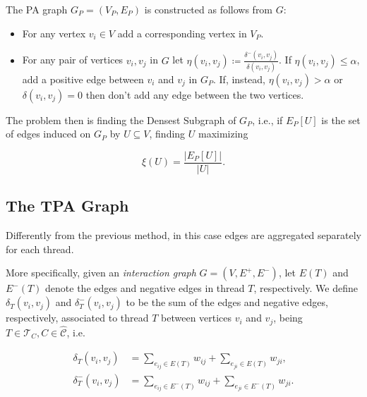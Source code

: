 \bigskip

The \acrfull{PA} graph $G_P = (V_{P}, E_{P}) $ is constructed as follows from
$G$:

\begin{itemize}
	\item For any vertex $v_{i} \in V$ add a corresponding vertex in $V_{P} $.
	\item For any pair of vertices $v_i, v_j$ in $G$ let $\eta(v_i,v_j)
		      \coloneqq \frac{\delta^{-} (v_i,v_j)}{\delta (v_i,v_j)} $. If
	      $\eta(v_i,v_j) \leq \alpha $, add a positive edge between $v_{i} $ and
	      $v_{j} $ in $G_{P} $. If, instead, $\eta(v_i,v_j) > \alpha $ or $\delta(v_{i}, v_{j}) =
		      0$ then don't add any edge between the two vertices.
\end{itemize}

The problem then is finding the Densest Subgraph of $G_P$, i.e., if $E_{P} [U]$
is the set of edges induced on $G_P$ by $U \subseteq V$, finding $U$ maximizing

\begin{equation}
	\xi(U) = \frac{|E_{P} [U]|}{|U|}.
\end{equation}

\subsection{The \acrlong{TPA} Graph}%
\label{ssub:the_tpa_graph}

Differently from the previous method, in this case edges are aggregated
separately for each thread.

\bigskip

More specifically, given an \emph{interaction graph} $G = (V, E^{+}, E^{-})$,
let $E(T)$ and
$E^-(T)$ denote the edges and negative edges in thread $T$,
respectively. We define $\delta_{T}(v_{i}, v_{j})$ and
$\delta^{-} _{T}(v_{i}, v_{j})$ to be the sum of the edges and negative edges, respectively,
associated to thread $T$ between vertices $v_{i} $ and $v_{j} $, being $T \in
	\mathcal{T}_{C}, C \in \mathcal{\hat{C}}$, i.e.

\begin{align}
	\label{eq:}
	\delta_T(v_{i}, v_{j})   & = \sum^{}_{e_{ij} \in E(T)} w_{ij} + \sum^{}_{e_{ji} \in
	E(T)} w_{ji},
	\\
	\delta^-_T(v_{i}, v_{j}) & =  \sum^{}_{e_{ij} \in E^-(T)} w_{ij} + \sum^{}_{e_{ji} \in
	E^-(T)} w_{ji}.
\end{align}

